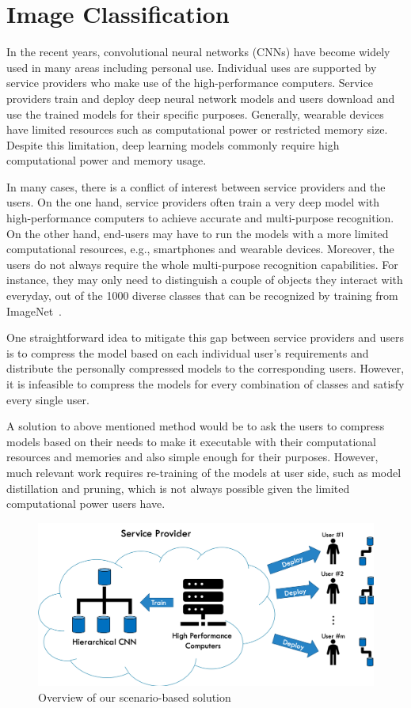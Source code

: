 \section{Image Classification}
\label{sec:intro}

In the recent years, convolutional neural networks (CNNs) have become widely used in many areas including personal use. 
Individual uses are supported by service providers who make use of the high-performance computers. 
Service providers train and deploy deep neural network models and 
users download and use the trained models for their specific purposes.
Generally, wearable devices have limited resources such as computational power or restricted memory size. 
Despite this limitation, deep learning models commonly require high computational power and memory usage.

In many cases, there is a conflict of interest between service providers and the users.
On the one hand, service providers often train a very deep model with high-performance computers to achieve accurate and multi-purpose recognition. 
On the other hand, end-users may have to run the models with a more limited computational resources, e.g., smartphones and wearable devices. 
Moreover, the users do not always require the whole multi-purpose recognition capabilities. 
For instance, they may only need to distinguish a couple of objects they interact with everyday, out of the 1000 diverse classes that can be recognized by training from ImageNet~\cite{deng2009imagenet}.

One straightforward idea to mitigate this gap between service providers and users is 
to compress the model based on each individual user's requirements and 
distribute the personally compressed models to the corresponding users. 
However, it is infeasible to compress the models for every combination of classes and satisfy every single user. 

A solution to above mentioned method would be to ask the users to compress models based on their needs to make it executable with their computational resources and memories and also simple enough for their purposes. 
However, much relevant work requires re-training of the models at user side, 
such as model distillation and pruning, 
which is not always possible given the limited computational power users have.

\begin{figure}
    \centering
    \includegraphics[width=.7\textwidth]{images/ArchitectureOverview(ver2).png}
    \caption{Overview of our scenario-based solution}
    \label{fig:overview}
\end{figure}

